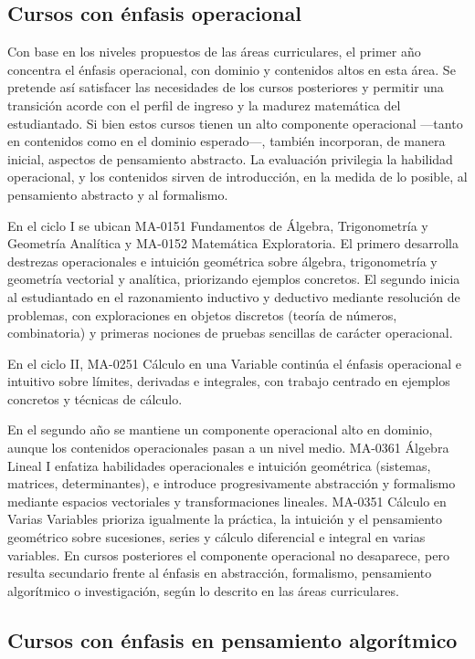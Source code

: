 \begin{refsection}
\subsection{Cursos con énfasis operacional}

Con base en los niveles propuestos de las áreas curriculares, el primer año concentra el énfasis operacional, con dominio y contenidos altos en esta área. Se pretende así satisfacer las necesidades de los cursos posteriores y permitir una transición acorde con el perfil de ingreso y la madurez matemática del estudiantado. Si bien estos cursos tienen un alto componente operacional ---tanto en contenidos como en el dominio esperado---, también incorporan, de manera inicial, aspectos de pensamiento abstracto. La evaluación privilegia la habilidad operacional, y los contenidos sirven de introducción, en la medida de lo posible, al pensamiento abstracto y al formalismo.

En el ciclo I se ubican MA-0151 Fundamentos de Álgebra, Trigonometría y Geometría Analítica y MA-0152 Matemática Exploratoria. El primero desarrolla destrezas operacionales e intuición geométrica sobre álgebra, trigonometría y geometría vectorial y analítica, priorizando ejemplos concretos. El segundo inicia al estudiantado en el razonamiento inductivo y deductivo mediante resolución de problemas, con exploraciones en objetos discretos (teoría de números, combinatoria) y primeras nociones de pruebas sencillas de carácter operacional.

En el ciclo II, MA-0251 Cálculo en una Variable continúa el énfasis operacional e intuitivo sobre límites, derivadas e integrales, con trabajo centrado en ejemplos concretos y técnicas de cálculo. 

En el segundo año se mantiene un componente operacional alto en dominio, aunque los contenidos operacionales pasan a un nivel medio. MA-0361 Álgebra Lineal I enfatiza habilidades operacionales e intuición geométrica (sistemas, matrices, determinantes), e introduce progresivamente abstracción y formalismo mediante espacios vectoriales y transformaciones lineales. MA-0351 Cálculo en Varias Variables prioriza igualmente la práctica, la intuición y el pensamiento geométrico sobre sucesiones, series y cálculo diferencial e integral en varias variables. En cursos posteriores el componente operacional no desaparece, pero resulta secundario frente al énfasis en abstracción, formalismo, pensamiento algorítmico o investigación, según lo descrito en las áreas curriculares.

\subsection{Cursos con énfasis en pensamiento algorítmico}


\end{refsection}
